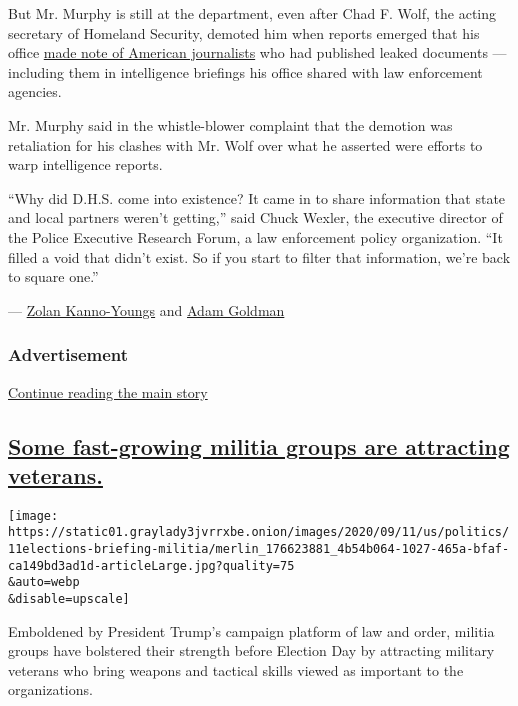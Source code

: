 But Mr. Murphy is still at the department, even after Chad F. Wolf, the
acting secretary of Homeland Security, demoted him when reports emerged
that his office
\href{https://www.nytimes3xbfgragh.onion/2020/08/01/us/politics/brian-murphy-homeland-security-protesters.html}{made
note of American journalists} who had published leaked documents ---
including them in intelligence briefings his office shared with law
enforcement agencies.

Mr. Murphy said in the whistle-blower complaint that the demotion was
retaliation for his clashes with Mr. Wolf over what he asserted were
efforts to warp intelligence reports.

``Why did D.H.S. come into existence? It came in to share information
that state and local partners weren't getting,'' said Chuck Wexler, the
executive director of the Police Executive Research Forum, a law
enforcement policy organization. ``It filled a void that didn't exist.
So if you start to filter that information, we're back to square one.''

---
\href{https://www.nytimes3xbfgragh.onion/by/zolan-kanno-youngs}{Zolan
Kanno-Youngs} and
\href{https://www.nytimes3xbfgragh.onion/by/adam-goldman}{Adam Goldman}

\hypertarget{advertisement-1}{%
\subsubsection{Advertisement}\label{advertisement-1}}

\protect\hyperlink{after-dfp-ad-mid2}{Continue reading the main story}

\hypertarget{some-fast-growing-militia-groups-are-attracting-veterans}{%
\subsection{\texorpdfstring{\protect\hyperlink{some-fast-growing-militia-groups-are-attracting-veterans}{Some
fast-growing militia groups are attracting
veterans.}}{Some fast-growing militia groups are attracting veterans.}}\label{some-fast-growing-militia-groups-are-attracting-veterans}}

\texttt{[image: https://static01.graylady3jvrrxbe.onion/images/2020/09/11/us/politics/11elections-briefing-militia/merlin\_176623881\_4b54b064-1027-465a-bfaf-ca149bd3ad1d-articleLarge.jpg?quality=75\\\&auto=webp\\\&disable=upscale]}

Emboldened by President Trump's campaign platform of law and order,
militia groups have bolstered their strength before Election Day by
attracting military veterans who bring weapons and tactical skills
viewed as important to the organizations.

